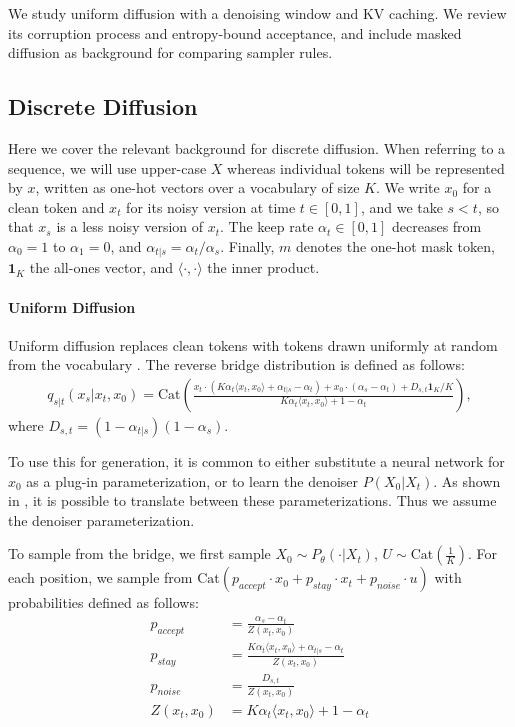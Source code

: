 We study uniform diffusion with a denoising window and KV caching. We review its corruption process and entropy-bound acceptance, and include masked diffusion as background for comparing sampler rules.
\subsection{Discrete Diffusion}
Here we cover the relevant background for discrete diffusion.
When referring to a sequence, we will use upper-case $X$ whereas individual tokens will be represented by $x$, written as one-hot vectors over a vocabulary of size $K$.
We write $x_0$ for a clean token and $x_t$ for its noisy version at time $t \in [0, 1]$, and we take $s < t$, so that $x_s$ is a less noisy version of $x_t$.
The keep rate $\alpha_t \in [0, 1]$ decreases from $\alpha_0 = 1$ to $\alpha_1 = 0$, and $\alpha_{t|s} = \alpha_t / \alpha_s$.
Finally, $m$ denotes the one-hot mask token, $\mathbf{1}_K$ the all-ones vector, and $\langle \cdot, \cdot \rangle$ the inner product.

\paragraph{Uniform Diffusion}
Uniform diffusion replaces clean tokens with tokens drawn uniformly at random from the vocabulary \citep{schiff2025simple, sahoo2025diffusion}.
The reverse bridge distribution is defined as follows:
\begin{align}
\label{eq:bridge}
    q_{s|t}(x_s | x_t, x_0) = \text{Cat} \left( \frac{x_t \cdot (K\alpha_t \langle x_t, x_0 \rangle + \alpha_{t|s} - \alpha_t) + x_0 \cdot ( \alpha_s - \alpha_t) + D_{s,t} \mathbf{1}_K / K}{K \alpha_t \langle x_t, x_0 \rangle + 1 - \alpha_t} \right),
\end{align}
where $D_{s,t} = (1 - \alpha_{t|s})(1 - \alpha_s)$.

To use this for generation, it is common to either substitute a neural network for $x_0$ as a plug-in parameterization, or to learn the denoiser $P(X_0 | X_t)$. As shown in \citet{gourevitch2026uniform}, it is possible to translate between these parameterizations. Thus we assume the denoiser parameterization.

To sample from the bridge, we first sample $X_0 \sim P_{\theta}(\cdot | X_t)$, $U \sim \text{Cat}(\frac{1}{K})$.
For each position, we sample from $\text{Cat}(p_{accept} \cdot x_0 + p_{stay} \cdot x_t + p_{noise} \cdot u)$ with probabilities defined as follows:
\begin{align}
\label{eq:true-rev-coords}
    p_{accept} &= \frac{\alpha_s - \alpha_t}{Z(x_t, x_0)} \\
    p_{stay} &= \frac{K\alpha_t \langle x_t, x_0 \rangle + \alpha_{t|s} - \alpha_t}{Z(x_t, x_0)} \\
    p_{noise} &= \frac{D_{s,t}}{Z(x_t, x_0)} \\
    Z(x_t, x_0) &= K \alpha_{t} \langle x_t, x_0 \rangle + 1 - \alpha_t
\end{align}

